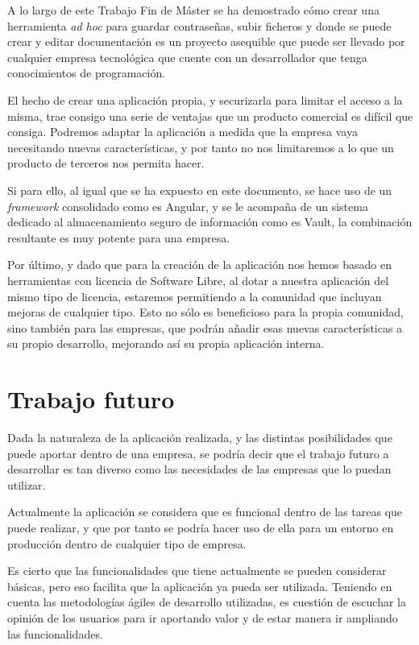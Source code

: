 \documentclass{\ClassPath/viu-tfm-template}
\begin{document}
A lo largo de este Trabajo Fin de Máster se ha demostrado cómo crear una herramienta \textit{ad hoc} para guardar contraseñas, subir ficheros y donde se puede crear y editar documentación es un proyecto asequible que puede ser llevado por cualquier empresa tecnológica que cuente con un desarrollador que tenga conocimientos de programación.

El hecho de crear una aplicación propia, y securizarla para limitar el acceso a la misma, trae consigo una serie de ventajas que un producto comercial es difícil que consiga. Podremos adaptar la aplicación a medida que la empresa vaya necesitando nuevas características, y por tanto no nos limitaremos a lo que un producto de terceros nos permita hacer.

Si para ello, al igual que se ha expuesto en este documento, se hace uso de un \textit{framework} consolidado como es Angular, y se le acompaña de un sistema dedicado al almacenamiento seguro de información como es Vault, la combinación resultante es muy potente para una empresa.

Por último, y dado que para la creación de la aplicación nos hemos basado en herramientas con licencia de Software Libre, al dotar a nuestra aplicación del mismo tipo de licencia, estaremos permitiendo a la comunidad que incluyan mejoras de cualquier tipo. Esto no sólo es beneficioso para la propia comunidad, sino también para las empresas, que podrán añadir esas nuevas características a su propio desarrollo, mejorando así su propia aplicación interna.


\vfill
\pagebreak

\chapter{Trabajo futuro}

Dada la naturaleza de la aplicación realizada, y las distintas posibilidades que puede aportar dentro de una empresa, se podría decir que el trabajo futuro a desarrollar es tan diverso como las necesidades de las empresas que lo puedan utilizar.

Actualmente la aplicación se considera que es funcional dentro de las tareas que puede realizar, y que por tanto se podría hacer uso de ella para un entorno en producción dentro de cualquier tipo de empresa.

Es cierto que las funcionalidades que tiene actualmente se pueden considerar básicas, pero eso facilita que la aplicación ya pueda ser utilizada. Teniendo en cuenta las metodologías ágiles de desarrollo utilizadas, es cuestión de escuchar la opinión de los usuarios para ir aportando valor y de estar manera ir ampliando las funcionalidades.
\end{document}
